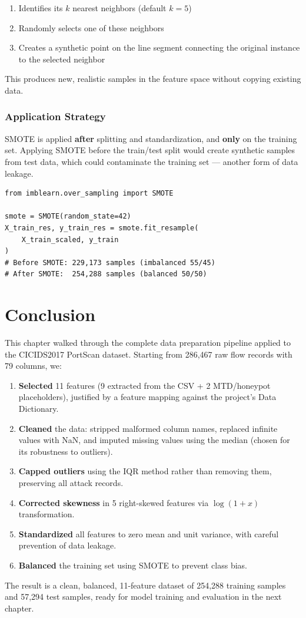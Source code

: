 \begin{enumerate}
    \item Identifies its $k$ nearest neighbors (default $k=5$)
    \item Randomly selects one of these neighbors
    \item Creates a synthetic point on the line segment connecting the original instance to the selected neighbor
\end{enumerate}

This produces new, realistic samples in the feature space without copying existing data.

\subsubsection{Application Strategy}

SMOTE is applied \textbf{after} splitting and standardization, and \textbf{only} on the training set. Applying SMOTE before the train/test split would create synthetic samples from test data, which could contaminate the training set — another form of data leakage.

\begin{lstlisting}[caption={Applying SMOTE to the training set only}]
from imblearn.over_sampling import SMOTE

smote = SMOTE(random_state=42)
X_train_res, y_train_res = smote.fit_resample(
    X_train_scaled, y_train
)
# Before SMOTE: 229,173 samples (imbalanced 55/45)
# After SMOTE:  254,288 samples (balanced 50/50)
\end{lstlisting}

\section{Conclusion}

This chapter walked through the complete data preparation pipeline applied to the CICIDS2017 PortScan dataset. Starting from 286,467 raw flow records with 79 columns, we:

\begin{enumerate}
    \item \textbf{Selected} 11 features (9 extracted from the CSV + 2 MTD/honeypot placeholders), justified by a feature mapping against the project's Data Dictionary.
    \item \textbf{Cleaned} the data: stripped malformed column names, replaced infinite values with NaN, and imputed missing values using the median (chosen for its robustness to outliers).
    \item \textbf{Capped outliers} using the IQR method rather than removing them, preserving all attack records.
    \item \textbf{Corrected skewness} in 5 right-skewed features via $\log(1+x)$ transformation.
    \item \textbf{Standardized} all features to zero mean and unit variance, with careful prevention of data leakage.
    \item \textbf{Balanced} the training set using SMOTE to prevent class bias.
\end{enumerate}

The result is a clean, balanced, 11-feature dataset of 254,288 training samples and 57,294 test samples, ready for model training and evaluation in the next chapter.
